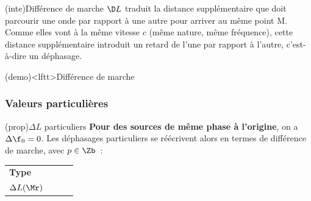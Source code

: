 \documentclass[../../main/main.tex]{subfiles}
\begin{document}
\begin{tcb}(inte){Différence de marche}
	$\D L$ traduit la distance supplémentaire que doit parcourir une onde par
	rapport à une autre pour arriver au même point M. Comme elles vont à la même
	vitesse $c$ (même nature, même fréquence), cette distance supplémentaire
	introduit un retard de l'une par rapport à l'autre, c'est-à-dire un déphasage.
\end{tcb}

\begin{tcb}(demo)<lftt>{Différence de marche}
	\psw{%
		\[
			\Delta{\f}_{2/1}(\Mr) =
			-k\SbMr + \f_{02} - \pa{-k\SaMr + \f_{01}} =
			-k \pa{\SbMr - \SaMr} + \f_{02} - \f_{01}
		\]
	}%
	\vspace{-15pt}
\end{tcb}

\subsubsection{Valeurs particulières}
\begin{tcb*}(prop){$\Delta{L}$ particuliers}
	\textbf{Pour des sources de même phase à l'origine}, on a $\Delta{\f_0} = 0$.
	Les déphasages particuliers se réécrivent alors en termes de différence de
	marche, avec $p \in \Zb$~:
	\smallbreak
	\begin{tabularx}{\linewidth}{l:Y:Y:Y}
		\textbf{Type}
		 &
		\textcolor{prop}{}
		 &
		\textcolor{prop}{}
		 &
		\textcolor{prop}{}
		\\
		$\Delta{L}(\Mr)$
		 &
		\vspace{-15pt}
		\vspace{-15pt}
		 &
		\vspace{-15pt}
		\vspace{-15pt}
		 &
		\vspace{-15pt}
		\vspace{-15pt}
	\end{tabularx}
\end{tcb*}
\end{document}
